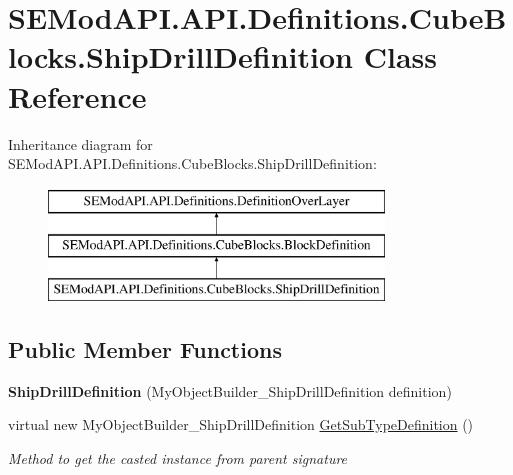 \hypertarget{class_s_e_mod_a_p_i_1_1_a_p_i_1_1_definitions_1_1_cube_blocks_1_1_ship_drill_definition}{}\section{S\+E\+Mod\+A\+P\+I.\+A\+P\+I.\+Definitions.\+Cube\+Blocks.\+Ship\+Drill\+Definition Class Reference}
\label{class_s_e_mod_a_p_i_1_1_a_p_i_1_1_definitions_1_1_cube_blocks_1_1_ship_drill_definition}
Inheritance diagram for S\+E\+Mod\+A\+P\+I.\+A\+P\+I.\+Definitions.\+Cube\+Blocks.\+Ship\+Drill\+Definition\+:\begin{figure}[H]
\begin{center}
\leavevmode
\includegraphics[height=3.000000cm]{class_s_e_mod_a_p_i_1_1_a_p_i_1_1_definitions_1_1_cube_blocks_1_1_ship_drill_definition}
\end{center}
\end{figure}
\subsection*{Public Member Functions}
\begin{DoxyCompactItemize}
\item 
\hypertarget{class_s_e_mod_a_p_i_1_1_a_p_i_1_1_definitions_1_1_cube_blocks_1_1_ship_drill_definition_a79dedbfbb6d31b99a1ce6239e8b02f60}{}{\bfseries Ship\+Drill\+Definition} (My\+Object\+Builder\+\_\+\+Ship\+Drill\+Definition definition)\label{class_s_e_mod_a_p_i_1_1_a_p_i_1_1_definitions_1_1_cube_blocks_1_1_ship_drill_definition_a79dedbfbb6d31b99a1ce6239e8b02f60}

\item 
virtual new My\+Object\+Builder\+\_\+\+Ship\+Drill\+Definition \hyperlink{class_s_e_mod_a_p_i_1_1_a_p_i_1_1_definitions_1_1_cube_blocks_1_1_ship_drill_definition_ac164c40320b5c9fbdb4ec0cd8f5d4e6b}{Get\+Sub\+Type\+Definition} ()
\begin{DoxyCompactList}\small\item\em Method to get the casted instance from parent signature \end{DoxyCompactList}\end{DoxyCompactItemize}
